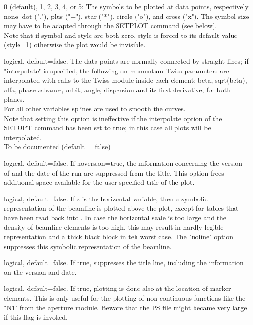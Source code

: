 \begin{madlist}
    0 (default), 1, 2, 3, 4, or 5: The symbols to be
     plotted at data points, respectively none, dot ("."), plus ("+"),
     star ("*"), circle ("o"), and cross ("x").  
     The symbol size may have to be adapted through the SETPLOT command
     (see below). \\ 
     Note that if symbol and style are both zero, style is
     forced to its default value (style=1) otherwise the plot would be
     invisible. 

    logical, default=false. The data points are
     normally connected by straight lines; if "interpolate" is
     specified, the following on-momentum Twiss parameters are
     interpolated with calls to the Twiss module inside 
     each element: beta, sqrt(beta), alfa, phase advance, orbit, angle,
     dispersion and its first derivative, for both planes. \\ 
     For all other variables splines are used to smooth
     the curves. \\ 
     Note that setting this option is ineffective if the interpolate
     option of the SETOPT command has been set to true; in this case all
     plots will be interpolated. \\
     

    To be documented (default = false)

    logical, default=false. If noversion=true, the
     information concerning the version of \madx and the date of the run
     are suppressed from the title.  
     This option frees additional space available for the user specified
     title of the plot.  

    logical, default=false. If s is the horizontal
     variable, then a symbolic representation of the beamline is plotted
     above the plot, except for tables that have been read back into \madx. 
     In case the horizontal scale is too large and the density of
     beamline elements is too high, this may result in hardly legible
     representation and a thick black block in teh worst case. 
     The "noline" option suppresses this symbolic representation of the
     beamline. 

    logical, default=false. If true, suppresses the title
     line, including the information on the version and date.  

    logical, default=false. If true, plotting is done
     also at the location of marker elements. This is only useful for
     the plotting of non-continuous functions like the "N1" from the
     aperture module. Beware that the PS file might became very large if
     this flag is invoked.
  

\end{madlist}
